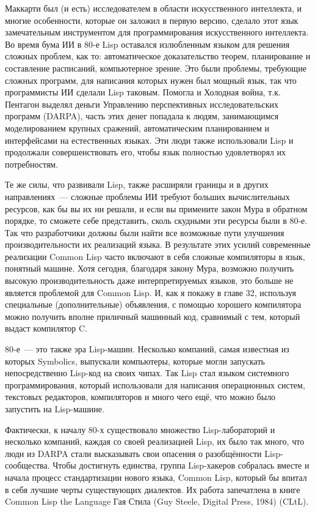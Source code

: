 Маккарти был (и есть) исследователем в области искусственного интеллекта, и многие
особенности, которые он заложил в первую версию, сделало этот язык замечательным
инструментом для программирования искусственного интеллекта. Во время бума ИИ в 80-е Lisp
оставался излюбленным языком для решения сложных проблем, как то: автоматическое
доказательство теорем, планирование и составление расписаний, компьютерное зрение. Это
были проблемы, требующие сложных программ, для написания которых нужен был мощный язык,
так что программисты ИИ сделали Lisp таковым. Помогла и Холодная война, т.к. Пентагон
выделял деньги Управлению перспективных исследовательских программ (DARPA), часть этих
денег попадала к людям, занимающимся моделированием крупных сражений, автоматическим
планированием и интерфейсами на естественных языках. Эти люди также использовали Lisp и
продолжали совершенствовать его, чтобы язык полностью удовлетворял их потребностям.

Те же силы, что развивали Lisp, также расширяли границы и в других направлениях~---
сложные проблемы ИИ требуют больших вычислительных ресурсов, как бы вы их ни решали, и
если вы примените закон Мура в обратном порядке, то сможете себе представить, сколь
скудными эти ресурсы были в 80-е. Так что разработчики должны были найти все возможные
пути улучшения производительности их реализаций языка. В результате этих усилий
современные реализации Common Lisp часто включают в себя сложные компиляторы в язык,
понятный машине. Хотя сегодня, благодаря закону Мура, возможно получить высокую
производительность даже интерпретируемых языков, это больше не является проблемой для
Common Lisp. И, как я покажу в главе 32, используя специальные (дополнительные)
объявления, с помощью хорошего компилятора можно получить вполне приличный машинный код,
сравнимый с тем, который выдаст компилятор C.

80-е~--- это также эра Lisp-машин. Несколько компаний, самая известная из которых
Symbolics, выпускали компьютеры, которые могли запускать непосредственно Lisp-код на своих
чипах. Так Lisp стал языком системного программирования, который использовали для
написания операционных систем, текстовых редакторов, компиляторов и много чего ещё, что
можно было запустить на Lisp-машине.

Фактически, к началу 80-х существовало множество Lisp-лабораторий и несколько компаний,
каждая со своей реализацией Lisp, их было так много, что люди из DARPA стали высказывать
свои опасения о разобщённости Lisp-сообщества. Чтобы достигнуть единства, группа
Lisp-хакеров собралась вместе и начала процесс стандартизации нового языка, Common Lisp,
который бы впитал в себя лучшие черты существующих диалектов. Их работа запечатлена в
книге Common Lisp the Language Гая Стила (Guy Steele, Digital Press, 1984) (CLtL).

